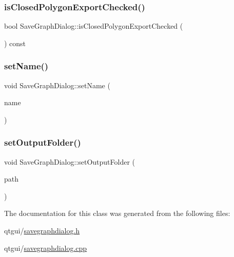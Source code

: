 \subsubsection{\texorpdfstring{isClosedPolygonExportChecked()}{isClosedPolygonExportChecked()}}
{\footnotesize\ttfamily bool Save\+Graph\+Dialog\+::is\+Closed\+Polygon\+Export\+Checked (\begin{DoxyParamCaption}{ }\end{DoxyParamCaption}) const}

\mbox{\label{class_save_graph_dialog_a4cdb6c4a898716a427727d571c94cbdc}} 
\subsubsection{\texorpdfstring{setName()}{setName()}}
{\footnotesize\ttfamily void Save\+Graph\+Dialog\+::set\+Name (\begin{DoxyParamCaption}\item[{Q\+String}]{name }\end{DoxyParamCaption})}

\mbox{\label{class_save_graph_dialog_a3636a45047e51b5a9d42cf7af479e375}} 
\subsubsection{\texorpdfstring{setOutputFolder()}{setOutputFolder()}}
{\footnotesize\ttfamily void Save\+Graph\+Dialog\+::set\+Output\+Folder (\begin{DoxyParamCaption}\item[{Q\+String}]{path }\end{DoxyParamCaption})}



The documentation for this class was generated from the following files\+:\begin{DoxyCompactItemize}
\item 
qtgui/\mbox{\hyperlink{savegraphdialog_8h}{savegraphdialog.\+h}}\item 
qtgui/\mbox{\hyperlink{savegraphdialog_8cpp}{savegraphdialog.\+cpp}}\end{DoxyCompactItemize}
